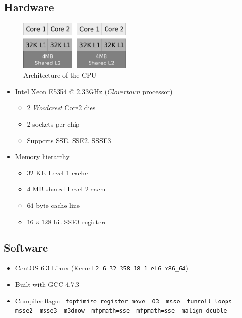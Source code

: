 \documentclass[12pt]{article}
\begin{document}
\subsection{Hardware}
\begin{figure}
	\begin{center}
	\includegraphics[width=0.5\textwidth]{xeon_die.pdf}
	\end{center}
	\caption{Architecture of the CPU}
\end{figure}

\begin{itemize}
	\item Intel Xeon E5354 @ 2.33GHz (\emph{Clovertown} processor)
	\begin{itemize}
		\item 2 \emph{Woodcrest} Core2 dies
		\item 2 sockets per chip
		\item Supports SSE, SSE2, SSSE3
	\end{itemize}
	\item Memory hierarchy
	\begin{itemize}
		\item $32$ KB Level 1 cache
		\item $4$ MB shared Level 2 cache
		\item $64$ byte cache line
		\item $16 \times 128$ bit SSE3 registers
	\end{itemize}
\end{itemize}

\subsection{Software}
\begin{itemize}
	\item CentOS 6.3 Linux (Kernel \texttt{2.6.32-358.18.1.el6.x86\_64})
	\item Built with GCC 4.7.3
	\item Compiler flags: \texttt{-foptimize-register-move -O3 -msse -funroll-loops -msse2 -msse3 -m3dnow -mfpmath=sse -mfpmath=sse -malign-double}
\end{itemize}
\end{document}
